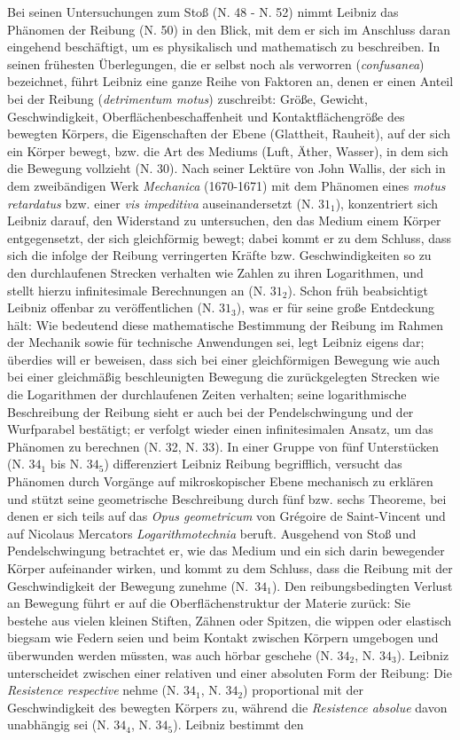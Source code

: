 Bei seinen Untersuchungen zum Sto{\ss} (N. 48 - N. 52) nimmt Leibniz das Phänomen der Reibung (N. 50) in den Blick, mit dem er sich im Anschluss daran eingehend beschäftigt, um es physikalisch und mathematisch zu beschreiben. In seinen frühesten Überlegungen, die er selbst noch als verworren (\textit{confusanea}) bezeichnet, führt Leibniz eine ganze Reihe von Faktoren an, denen er einen Anteil bei der Reibung (\textit{detrimentum motus}) zuschreibt: Grö{\ss}e, Gewicht, Geschwindigkeit, Oberflächenbeschaffenheit und Kontaktflächengrö{\ss}e des bewegten Körpers, die Eigenschaften der Ebene (Glattheit, Rauheit), auf der sich ein Körper bewegt, bzw. die Art des Mediums (Luft, Äther, Wasser), in dem sich die Bewegung vollzieht (N. 30). Nach seiner Lektüre von John Wallis, der sich in dem zweibändigen Werk \textit{Mechanica} (1670-1671) mit dem Phänomen eines \textit{motus retardatus} bzw. einer \textit{vis impeditiva} auseinandersetzt (N. $31_1$), konzentriert sich Leibniz darauf, den Widerstand zu untersuchen, den das Medium einem Körper entgegensetzt, der sich gleichförmig bewegt; dabei kommt er zu dem Schluss, dass sich die infolge der Reibung verringerten Kräfte bzw. Geschwindigkeiten so zu den durchlaufenen Strecken verhalten wie Zahlen zu ihren Logarithmen, und stellt hierzu infinitesimale Berechnungen an (N. $31_2$). Schon früh beabsichtigt Leibniz offenbar zu veröffentlichen (N. $31_3$), was er für seine gro{\ss}e Entdeckung hält: Wie bedeutend diese mathematische Bestimmung der Reibung im Rahmen der Mechanik sowie für technische Anwendungen sei, legt Leibniz eigens dar; überdies will er beweisen, dass sich bei einer gleichförmigen Bewegung wie auch bei einer gleichmä{\ss}ig beschleunigten Bewegung die zurückgelegten Strecken wie die Logarithmen der durchlaufenen Zeiten verhalten; seine logarithmische Beschreibung der Reibung sieht er auch bei der Pendelschwingung und der Wurfparabel bestätigt; er verfolgt wieder einen infinitesimalen Ansatz, um das Phänomen zu berechnen (N. 32, N. 33). In einer Gruppe von fünf Unterstücken (N. $34_1$ bis N. $34_5$) differenziert Leibniz Reibung begrifflich, versucht das Phänomen durch Vorgänge auf mikroskopischer Ebene mechanisch zu erklären und stützt seine geometrische Beschreibung durch fünf bzw. sechs Theoreme, bei denen er sich teils auf das \textit{Opus geometricum} von Gr\'{e}goire de Saint-Vincent und auf Nicolaus Mercators \textit{Logarithmotechnia} beruft. Ausgehend von Sto{\ss} und Pendelschwingung betrachtet er, wie das Medium und ein sich darin bewegender Körper aufeinander wirken, und kommt zu dem Schluss, dass die Reibung mit der Geschwindigkeit der Bewegung zunehme (N.~$34_1$). Den reibungsbedingten Verlust an Bewegung führt er auf die Oberflächenstruktur der Materie zurück: Sie bestehe aus vielen kleinen Stiften, Zähnen oder Spitzen, die wippen oder elastisch biegsam wie Federn seien und beim Kontakt zwischen Körpern umgebogen und überwunden werden müssten, was auch hörbar geschehe (N. $34_2$, N. $34_3$). Leibniz unterscheidet zwischen einer relativen und einer absoluten Form der Reibung: Die \textit{Resistence respective} nehme (N. $34_1$, N. $34_2$) proportional mit der Geschwindigkeit des bewegten Körpers zu, während die \textit{Resistence absolue} davon unabhängig sei (N. $34_4$, N. $34_5$). Leibniz bestimmt den 